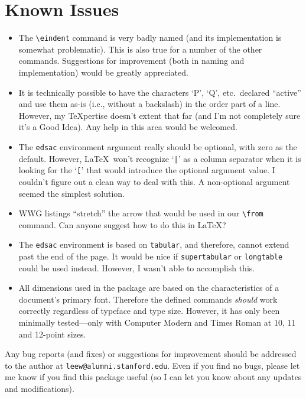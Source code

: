 \documentclass[letterpaper,11pt]{article}
\begin{document}
\section*{Known Issues}
\begin{itemize}
    \item
    The \verb"\eindent" command is very badly named (and its implementation is
    somewhat problematic).  This is also true for a number of the
    other commands.  Suggestions for improvement (both in naming and
    implementation) would be greatly appreciated.
    \item
    It is technically possible to have the characters `P', `Q', etc.\
    declared ``active'' and use them as-is (i.e., without a backslash)
    in the order part of a line.  However, my \TeX{pertise} doesn't
    extent that far (and I'm not completely sure it's a Good Idea).
    Any help in this area would be welcomed.
    \item
    The \texttt{edsac} environment argument really should be
    optional, with zero as the default.  However, \LaTeX\ won't
    recognize `\verb"|"' as a column separator when it is looking for
    the `\verb"["' that would introduce the optional argument value.
    I couldn't figure
    out a clean way to deal with this.  A non-optional argument seemed
    the simplest solution.
    \item
    WWG listings ``stretch'' the arrow that would be used in our
    \verb"\from" command.  Can anyone suggest how to do this in
    \LaTeX?
    \item
    The \texttt{edsac} environment is based on \texttt{tabular}, and
    therefore, cannot extend past the end of the page.  It would be
    nice if \texttt{supertabular} or \texttt{longtable} could be used
    instead.  However,  I wasn't able to accomplish this.
    \item
    All dimensions used in the package are based on the
    characteristics of a document's primary font. Therefore the
    defined commands \emph{should} work correctly regardless of
    typeface and type size.  However, it has only been minimally
    tested---only with Computer Modern and Times Roman at 10, 11 and
    12-point sizes.
\end{itemize}

Any bug reports (and fixes) or suggestions for improvement
should be addressed to the author at \texttt{leew@alumni.stanford.edu}.
Even if you find no bugs, please let me know if you find this package
useful (so I can let you know about any updates and modifications).
\end{document}
